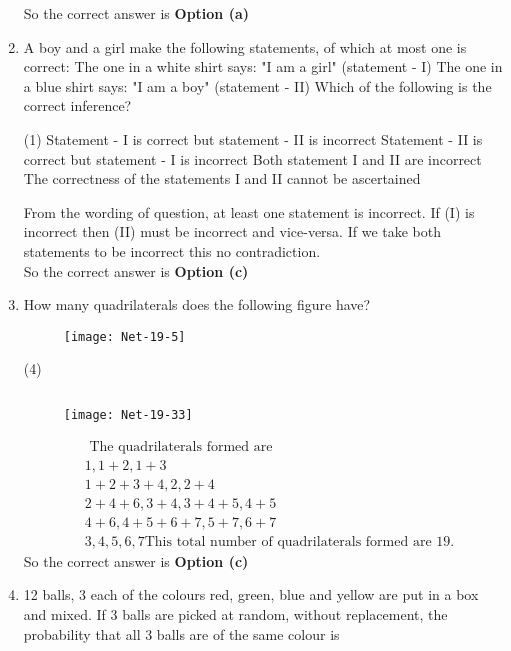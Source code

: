 \begin{enumerate}
\begin{answer}
	So the correct answer is \textbf{Option (a)}
\end{answer}
\item  A boy and a girl make the following statements, of which at most one is correct:
The one in a white shirt says: "I am a girl" (statement - I)
The one in a blue shirt says: "I am a boy" (statement - II)
Which of the following is the correct inference?
	 \begin{tasks}(1)
		\task[\textbf{a.}]Statement - I is correct but statement - II is incorrect
		\task[\textbf{b.}]Statement - II is correct but statement - I is incorrect
		\task[\textbf{c.}]Both statement I and II are incorrect
		\task[\textbf{d.}] The correctness of the statements I and II cannot be ascertained	
	\end{tasks}
\begin{answer}
	From the wording of question, at least one statement is incorrect. If (I) is incorrect then (II) must be incorrect and vice-versa. If we take both statements to be incorrect this no contradiction.\\
	So the correct answer is \textbf{Option (c)}
\end{answer}
\item  How many quadrilaterals does the following figure have?	
\begin{figure}[H]
	\centering
	\texttt{[image: Net-19-5]}
\end{figure}
 \begin{tasks}(4)
\end{tasks}
\begin{answer}$\left. \right. $
	\begin{figure}[H]
		\centering
		\texttt{[image: Net-19-33]}
	\end{figure}
	\begin{align*}
	&\text{ The quadrilaterals formed are}\\
	&1,1+2,1+3 \\
	&1+2+3+4,2,2+4 \\
	&2+4+6,3+4,3+4+5,4+5 \\
	&4+6,4+5+6+7,5+7,6+7 \\
	&3,4,5,6,7
	\text{This total number of quadrilaterals formed are $19 .$}
	\end{align*}
		So the correct answer is \textbf{Option (c)}
\end{answer}
\item  12 balls, 3 each of the colours red, green, blue and yellow are put in a box and mixed. If 3 balls are picked at random, without replacement, the probability that all 3 balls are of the same colour is

\end{enumerate}
